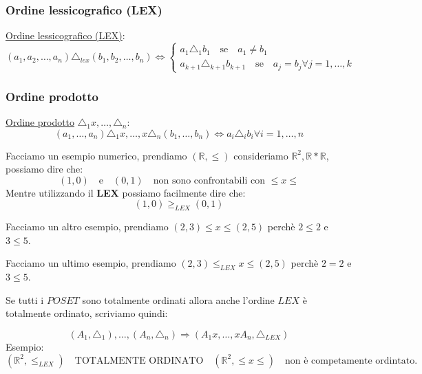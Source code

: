\documentclass{article}
\theoremstyle{definition}
\begin{document}
\subsubsection{Ordine lessicografico (LEX)}
\underline{Ordine lessicografico (LEX)}:
\[ 
(a_1,a_2,\ldots, a_n) \triangle_{lex} (b_1,b_2,\ldots, b_n) \Leftrightarrow   
\begin{cases}
        a_1 \triangle_1 b_1 \quad \mbox{se} \quad  a_1 \not = b_1 \\
        a_{k+1} \triangle_{k+1} b_{k+1} \quad \mbox{se} \quad  a_j = b_j \forall j = 1,\ldots, k
\end{cases}
\]


\subsubsection{Ordine prodotto}
\underline{Ordine prodotto} $\triangle_1x,\ldots,\triangle_n$:
\begin{equation*}
        (a_1,\ldots,a_n) \triangle_1x,\ldots, x\triangle_n(b_1,\ldots,b_n) \Leftrightarrow a_i \triangle_i b_i \forall i = 1,\ldots,n
\end{equation*}

Facciamo un esempio numerico, prendiamo $(\mathbb{R}, \le)$ consideriamo $\mathbb{R}^2, \mathbb{R}*\mathbb{R}$, possiamo dire che:
\begin{equation*}
        (1, 0) \quad \mbox{e} \quad (0,1) \quad \mbox{non sono confrontabili con $\le x \le$}
\end{equation*}
Mentre utilizzando il \textbf{LEX} possiamo facilmente dire che:
\begin{equation*}
        (1, 0) \ge_{LEX} (0,1)
\end{equation*}

Facciamo un altro esempio, prendiamo $(2,3) \le x \le(2,5)$ perchè $2 \le 2$ e $3 \le 5$. \par
Facciamo un ultimo esempio, prendiamo $(2,3) \le_{LEX} x \le(2,5)$ perchè $2 = 2$ e $3 \le 5$. \newline

Se tutti i $POSET$ sono totalmente ordinati allora anche l'ordine $LEX$ è totalmente ordinato, scriviamo quindi:

\begin{equation*}
        (A_1,\triangle_1), \ldots, (A_n, \triangle_n) \Rightarrow (A_1x,\ldots,xA_n,\triangle_{LEX})
\end{equation*}
Esempio:
\begin{equation*}
        (\mathbb{R}^2, \le_{LEX}) \quad \mbox{TOTALMENTE ORDINATO} \quad (\mathbb{R}^2, \le x \le) \quad \mbox{non è competamente ordintato}. 
\end{equation*}
\end{document}
